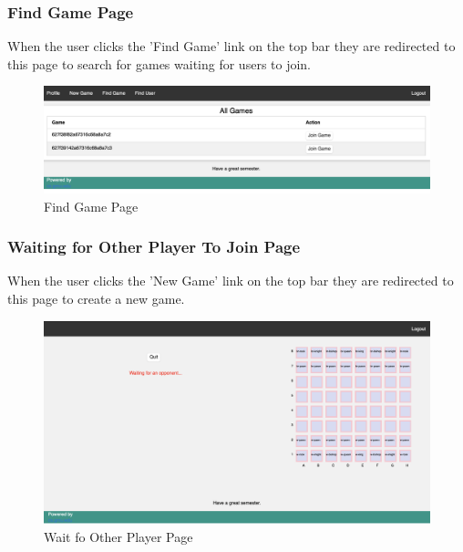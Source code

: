 \documentclass[12pt]{article}
\begin{document}
\subsubsection{Find Game Page}
When the user clicks the 'Find Game' link on the top bar they are redirected to this page to search for games waiting for users to join.
\begin{figure}[h!]
    \includegraphics[width=\linewidth]{FINDING_A_GAME.png}
    \caption{Find Game Page}
\end{figure}

\subsubsection{Waiting for Other Player To Join Page}
When the user clicks the 'New Game' link on the top bar they are redirected to this page to create a new game.
\begin{figure}[h!]
    \includegraphics[width=\linewidth]{WAITING_FOR_USER_TO_JOIN_GAME.png}
    \caption{Wait fo Other Player Page}
\end{figure}
\end{document}
